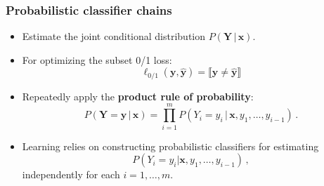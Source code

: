 \documentclass[]{beamer}
\renewcommand{\Pr}{P}
\renewcommand{\vec}[1]{\boldsymbol{#1}}
\newcommand{\given}{\, | \,}
\newcommand{\bx}{\boldsymbol{x}}
\newcommand{\by}{\boldsymbol{y}}
\newcommand{\bz}{\boldsymbol{z}}
\newcommand{\assert}[1]{\llbracket #1 \rrbracket}
\renewcommand{\emph}[1]{\textbf{\color{putblue}#1}}
\begin{document}


\begin{frame}
\frametitle{Probabilistic classifier chains}

\begin{itemize}
\item Estimate the {joint} conditional distribution $\Pr(\vec{Y} \given  \vec{x})$. 
\item For optimizing the subset 0/1 loss:  $$ \ell_{0/1}(\by, \hat{\by}) = \assert{\by \ne \hat{\by}}$$
\item Repeatedly apply the \emph{product rule of probability}:
$$
\Pr(\vec{Y} = \vec{y} \given \vec{x}) = \prod_{i=1}^{m} \Pr(Y_i = y_i \given \vec{x}, y_1, \ldots,y_{i-1}) \, .
$$
\item  Learning relies on constructing probabilistic classifiers for estimating 
$$
\Pr(Y_i = y_i|\vec{x}, y_1, \ldots,y_{i-1}) \,,
$$
{independently} for each $i = 1, \ldots, m$. 
\end{itemize}
\end{frame}
\end{document}
